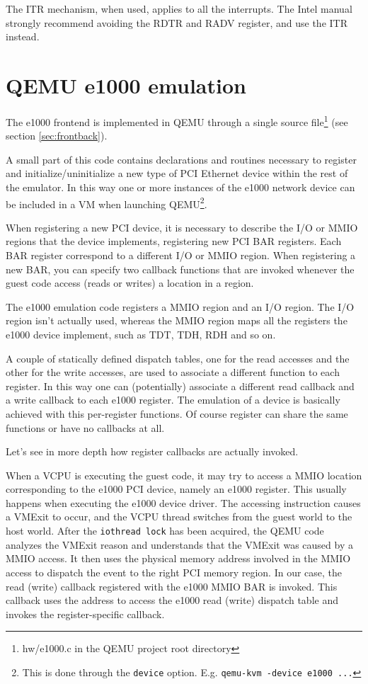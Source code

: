 \vspace{0.5cm}

The ITR mechanism, when used, applies to all the interrupts. The Intel manual strongly recommend avoiding the RDTR and RADV register,
and use the ITR instead.



\section{QEMU e1000 emulation}
\label{sec:e1000emu}
The e1000 frontend is implemented in QEMU through a single source file\footnote{hw/e1000.c in the QEMU project root directory} (see 
section \ref{sec:frontback}).

A small part of this code contains declarations and routines necessary to register and initialize/uninitialize a new type of PCI Ethernet 
device within the rest of the emulator. In this way one or more instances of the e1000 network device can be included in a VM
when launching QEMU\footnote{This is done through the \texttt{device} option. E.g. \texttt{qemu-kvm -device e1000 ...} }.

When registering a new PCI device, it is necessary to describe the I/O or MMIO regions that the device implements, registering new
PCI BAR registers. Each BAR register correspond to a different I/O or MMIO region.
When registering a new BAR, you can specify two callback functions that are invoked whenever the guest code access (reads or writes)
a location in a region.

The e1000 emulation code registers a MMIO region and an I/O region. The I/O region isn't actually used, whereas
the MMIO region maps all the registers the e1000 device implement, such as TDT, TDH, RDH and so on.

A couple of statically defined dispatch tables, one for the read accesses and the other for the write accesses, are used to associate a
different function to each register.
In this way one can (potentially) associate a different read callback and a write callback to each e1000 register.
The emulation of a device is basically achieved with this per-register functions. Of course register can share the same functions or have
no callbacks at all.

\vspace{0.5cm}
Let's see in more depth how register callbacks are actually invoked.

When a VCPU is executing the guest code, it may try to access a MMIO location corresponding to the e1000 PCI device, namely an e1000
register. This usually happens when executing the e1000 device driver.
The accessing instruction causes a VMExit to occur, and the VCPU thread switches from the guest world to the host world. 
After the \texttt{iothread lock} has been acquired, the QEMU code analyzes the VMExit reason and understands that the VMExit was caused
by a MMIO access.
It then uses the physical memory address involved in the MMIO access to dispatch the event to the right PCI memory region.
In our case, the read (write) callback registered with the e1000 MMIO BAR is invoked. This callback uses the address to access the 
e1000 read (write) dispatch table and invokes the register-specific callback.

